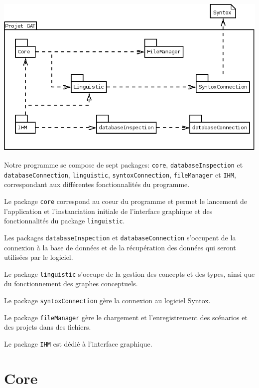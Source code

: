 \documentclass[12pt]{report}
\begin{document}
\begin{center}
\includegraphics[scale=0.45]{diversuml/DiagPackages.png}
\end{center}


Notre programme se compose de sept packages: \texttt{core}, \texttt{databaseInspection} et \texttt{databaseConnection},  \texttt{linguistic}, \texttt{syntoxConnection}, \texttt{fileManager} et  \texttt{IHM}, correspondant aux différentes fonctionnalités du programme.

Le package \texttt{core} correspond au coeur du programme et permet le lancement de l'application et l'instanciation initiale de l'interface graphique et des fonctionnalités du package \texttt{linguistic}.

Les packages \texttt{databaseInspection} et \texttt{databaseConnection} s'occupent de la connexion à la base de données et de la récupération des données qui seront utilisées par le logiciel.

Le package \texttt{linguistic} s'occupe de la gestion des concepts et des types, ainsi que du fonctionnement des graphes conceptuels.

Le package \texttt{syntoxConnection} gère la connexion au logiciel Syntox.

Le package \texttt{fileManager} gère le chargement et l'enregistrement des scénarios et des projets dans des fichiers.

Le package \texttt{IHM} est dédié à l'interface graphique.

\section{Core}
\end{document}
